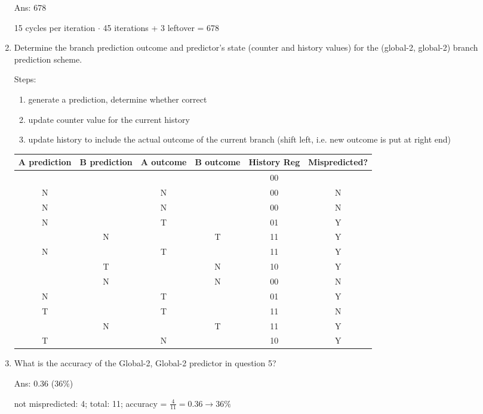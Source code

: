 \documentclass[12pt]{article}
\begin{document}
\begin{enumerate}
        Ans: 678

        15 cycles per iteration $\cdot$ 45 iterations + 3 leftover = 678

        \item Determine the branch prediction outcome and predictor's state (counter and history values) for the 
        (global-2, global-2) branch prediction scheme.

        Steps:

        \begin{enumerate}
            \item generate a prediction, determine whether correct
            \item update counter value for the current history
            \item update history to include the actual outcome of the current branch (shift left, i.e. new outcome is put at right end)
        \end{enumerate}

        \begin{tabular}[ht!]{|c|c|c|c|c|c|}\hline
            A prediction & B prediction & A outcome & B outcome & History Reg & Mispredicted? \\\hline
                         &              &           &           & 00          &               \\\hline
            N            &              & N         &           & 00          & N             \\\hline
            N            &              & N         &           & 00          & N             \\\hline
            N            &              & T         &           & 01          & Y             \\\hline
                         & N            &           & T         & 11          & Y             \\\hline
            N            &              & T         &           & 11          & Y             \\\hline
                         & T            &           & N         & 10          & Y             \\\hline
                         & N            &           & N         & 00          & N             \\\hline
            N            &              & T         &           & 01          & Y             \\\hline
            T            &              & T         &           & 11          & N             \\\hline
                         & N            &           & T         & 11          & Y             \\\hline
            T            &              & N         &           & 10          & Y             \\\hline
        \end{tabular}

        \item What is the accuracy of the Global-2, Global-2 predictor in question 5?
        
        Ans: 0.36 (36\%)

        not mispredicted: 4; total: 11; accuracy = $\frac{4}{11} = 0.36 \longrightarrow 36\%$

    \end{enumerate}
\end{document}
